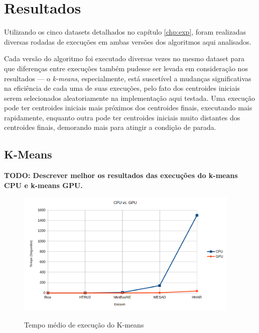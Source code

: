 \documentclass[12pt,
openright, 
oneside, %
a4paper,    %
brazil]{facom-ufu-abntex2}
\begin{document}

\chapter{Resultados}
\label{chp:resultados}

Utilizando os cinco datasets detalhados no capítulo \ref{chp:exp}, foram realizadas diversas rodadas de execuções em ambas versões dos algoritmos aqui analisados.

Cada versão do algoritmo foi executado diversas vezes no mesmo dataset para que diferenças entre execuções também pudesse ser levada em consideração nos resultados — o \textit{k-means}, especialmente, está suscetível a mudanças significativas na eficiência de cada uma de suas execuções, pelo fato dos centroides iniciais serem selecionados aleatoriamente na implementação aqui testada. Uma execução pode ter centroides iniciais mais próximos dos centroides finais, executando mais rapidamente, enquanto outra pode ter centroides iniciais muito distantes dos centroides finais, demorando mais para atingir a condição de parada.




\section{K-Means}
\label{sec:testesDeSpeedup}

\textbf{TODO: Descrever melhor os resultados das execuções do k-means CPU e k-means GPU.}


\begin{figure}[h]
  \caption{Tempo médio de execução do K-means}
  \centering
  \includegraphics[width=0.95\textwidth]{kMeansAvgTime.png}
  \label{fig:kMeansAvgTime}
\end{figure}
\end{document}
